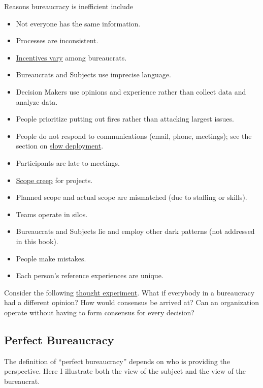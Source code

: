 Reasons bureaucracy is inefficient include
\begin{itemize}
    \item Not everyone has the same information.
    \item Processes are inconsistent.
    \item \hyperref[sec:motivations]{Incentives vary} among bureaucrats.
    \item Bureaucrats and Subjects use imprecise language.
    \item Decision Makers use opinions and experience rather than collect data and analyze data.
    \item People prioritize putting out fires rather than attacking largest issues.
    \item People do not respond to communications (email, phone, meetings); see the section on \hyperref[sec:slow-deployment]{slow deployment}. %
    \item Participants are late to meetings.
    \item \href{sec:scope-creep}{Scope creep} for projects.
    \item Planned scope and actual scope are mismatched  (due to staffing or skills).
    \item Teams operate in silos.
    \item Bureaucrats and Subjects lie and employ other dark patterns (not addressed in this book).
    \item People make mistakes.
    \item Each person's reference experiences are unique.
\end{itemize}
Consider the following \href{https://en.wikipedia.org/wiki/Thought_experiment}{thought experiment}. 
What if everybody in a bureaucracy had a different opinion? How would consensus be arrived at? Can an organization operate without having to form consensus for every decision? 



\subsection*{Perfect Bureaucracy}

The definition of ``perfect bureaucracy'' depends on who is providing the perspective. Here I illustrate both the view of the subject and the view of the bureaucrat. 

